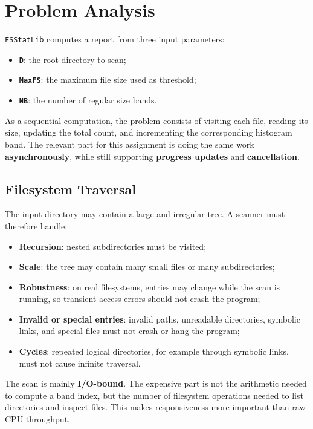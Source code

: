 \clearpage
\section{Problem Analysis}

\texttt{FSStatLib} computes a report from three input parameters:

\begin{itemize}
  \item \textbf{\texttt{D}}: the root directory to scan;
  \item \textbf{\texttt{MaxFS}}: the maximum file size used as threshold;
  \item \textbf{\texttt{NB}}: the number of regular size bands.
\end{itemize}

As a sequential computation, the problem consists of visiting each file, reading its size, updating the total count, and incrementing the corresponding histogram band.
The relevant part for this assignment is doing the same work \textbf{asynchronously}, while still supporting \textbf{progress updates} and \textbf{cancellation}.

\subsection{Filesystem Traversal}

The input directory may contain a large and irregular tree.
A scanner must therefore handle:

\begin{itemize}
  \item \textbf{Recursion}: nested subdirectories must be visited;
  \item \textbf{Scale}: the tree may contain many small files or many subdirectories;
  \item \textbf{Robustness}: on real filesystems, entries may change while the scan is running, so transient access errors should not crash the program;
  \item \textbf{Invalid or special entries}: invalid paths, unreadable directories, symbolic links, and special files must not crash or hang the program;
  \item \textbf{Cycles}: repeated logical directories, for example through symbolic links, must not cause infinite traversal.
\end{itemize}

The scan is mainly \textbf{I/O-bound}.
The expensive part is not the arithmetic needed to compute a band index, but the number of filesystem operations needed to list directories and inspect files.
This makes responsiveness more important than raw CPU throughput.


